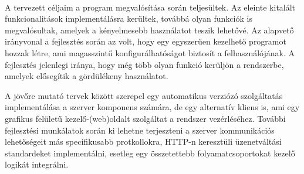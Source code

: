 \documentclass[12pt]{report}
\begin{document}
\paragraph{}
A tervezett céljaim a program megvalósítása során teljesültek. Az eleinte kitalált funkcionalitások implementálásra kerültek, továbbá olyan funkciók is megvalósultak, amelyek a kényelmesebb használatot teszik lehetővé.
Az alapvető irányvonal a fejlesztés során az volt, hogy egy egyszerűen kezelhető programot hozzak létre, ami magasszintű konfigurálhatóságot biztosít a felhasználójának.
A fejlesztés jelenlegi iránya, hogy még több olyan funkció kerüljön a rendszerbe, amelyek elősegítik a gördülékeny használatot. 

A jövőre mutató tervek között szerepel egy automatikus verziózó szolgáltatás implementálása a szerver komponens számára, de egy alternatív kliens is, ami egy grafikus felületű kezelő-(web)oldalt szolgáltat a rendszer vezérléséhez.
További fejlesztési munkálatok során ki lehetne terjeszteni a szerver kommunikációs lehetőségeit más specifikusabb protkollokra, HTTP-n keresztüli üzenetváltási standardeket implementálni, esetleg egy összetettebb folyamatcsoportokat kezelő logikát integrálni.
\end{document}
